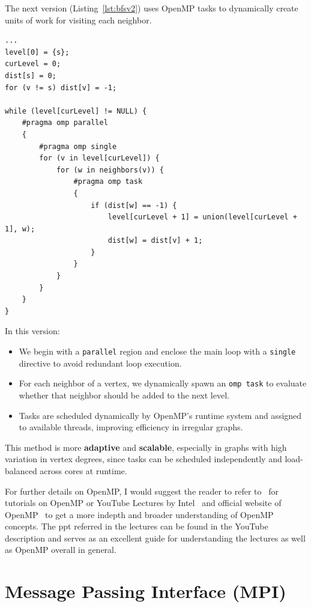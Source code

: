 \documentclass[12pt]{book}
\begin{document}
The next version (Listing~\ref{lst:bfsv2}) uses OpenMP tasks to dynamically create units of work for visiting each neighbor.

\begin{lstlisting}[style=cppstyle, caption={Parallel BFS using OpenMP tasks}, captionpos=b, label={lst:bfsv2}]
...
level[0] = {s};
curLevel = 0;
dist[s] = 0;
for (v != s) dist[v] = -1;

while (level[curLevel] != NULL) {
    #pragma omp parallel
    {
        #pragma omp single
        for (v in level[curLevel]) {
            for (w in neighbors(v)) {
                #pragma omp task
                {
                    if (dist[w] == -1) {
                        level[curLevel + 1] = union(level[curLevel + 1], w);
                        dist[w] = dist[v] + 1;
                    }
                }
            }
        }
    }
}
\end{lstlisting}

In this version:
\begin{itemize}
    \item We begin with a \texttt{parallel} region and enclose the main loop with a \texttt{single} directive to avoid redundant loop execution.
    \item For each neighbor of a vertex, we dynamically spawn an \texttt{omp task} to evaluate whether that neighbor should be added to the next level.
    \item Tasks are scheduled dynamically by OpenMP’s runtime system and assigned to available threads, improving efficiency in irregular graphs.
\end{itemize}

This method is more \textbf{adaptive} and \textbf{scalable}, especially in graphs with high variation in vertex degrees, since tasks can be scheduled independently and load-balanced across cores at runtime.

For further details on OpenMP, I would suggest the reader to refer to~\cite{llnlOpenMP} for tutorials on OpenMP or YouTube Lectures by Intel~\cite{openmpYoutube} and official website of OpenMP~\cite{openmpOfficial} to get a more indepth and broader understanding of OpenMP concepts. The ppt referred in the lectures can be found in the YouTube description and serves as an excellent guide for understanding the lectures as well as OpenMP overall in general.

\chapter{Message Passing Interface (MPI)}
\end{document}
